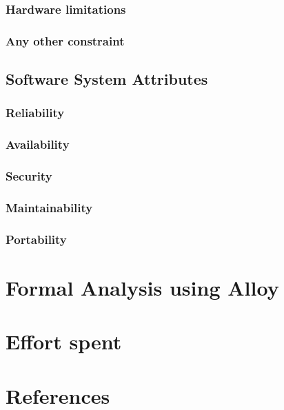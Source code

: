 \documentclass[a4paper]{report}
\begin{document}
\subsection{Hardware limitations}
\subsection{Any other constraint}

\section{Software System Attributes}
\subsection{Reliability}
\subsection{Availability}
\subsection{Security}
\subsection{Maintainability}
\subsection{Portability}

\chapter{Formal Analysis using Alloy}

\chapter{Effort spent}


\chapter{References}
\end{document}
